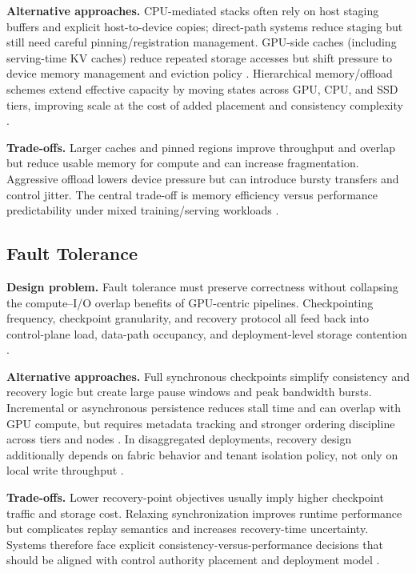 \textbf{Alternative approaches.} CPU-mediated stacks often rely on host staging buffers and explicit host-to-device copies; direct-path systems reduce staging but still need careful pinning/registration management. GPU-side caches (including serving-time KV caches) reduce repeated storage accesses but shift pressure to device memory management and eviction policy \cite{nvidia_gds_overview,kwon2023vllm,zhong2024distserve}. Hierarchical memory/offload schemes extend effective capacity by moving states across GPU, CPU, and SSD tiers, improving scale at the cost of added placement and consistency complexity \cite{rajbhandari2021zeroinfinity,geminifs2025}.

\textbf{Trade-offs.} Larger caches and pinned regions improve throughput and overlap but reduce usable memory for compute and can increase fragmentation. Aggressive offload lowers device pressure but can introduce bursty transfers and control jitter. The central trade-off is memory efficiency versus performance predictability under mixed training/serving workloads \cite{kwon2023vllm,nvidia_gds_best_practices,murray2021tfdata}.

\subsection{Fault Tolerance}

\textbf{Design problem.} Fault tolerance must preserve correctness without collapsing the compute--I/O overlap benefits of GPU-centric pipelines. Checkpointing frequency, checkpoint granularity, and recovery protocol all feed back into control-plane load, data-path occupancy, and deployment-level storage contention \cite{rajbhandari2021zeroinfinity,zhang2025hpcstoragesurvey}.

\textbf{Alternative approaches.} Full synchronous checkpoints simplify consistency and recovery logic but create large pause windows and peak bandwidth bursts. Incremental or asynchronous persistence reduces stall time and can overlap with GPU compute, but requires metadata tracking and stronger ordering discipline across tiers and nodes \cite{hdf5gds2020,geminifs2025}. In disaggregated deployments, recovery design additionally depends on fabric behavior and tenant isolation policy, not only on local write throughput \cite{nvmeof_spec,liu2017rackscale,infiniband_spec}.

\textbf{Trade-offs.} Lower recovery-point objectives usually imply higher checkpoint traffic and storage cost. Relaxing synchronization improves runtime performance but complicates replay semantics and increases recovery-time uncertainty. Systems therefore face explicit consistency-versus-performance decisions that should be aligned with control authority placement and deployment model \cite{rajbhandari2021zeroinfinity,hdf5gds2020,geminifs2025}.

